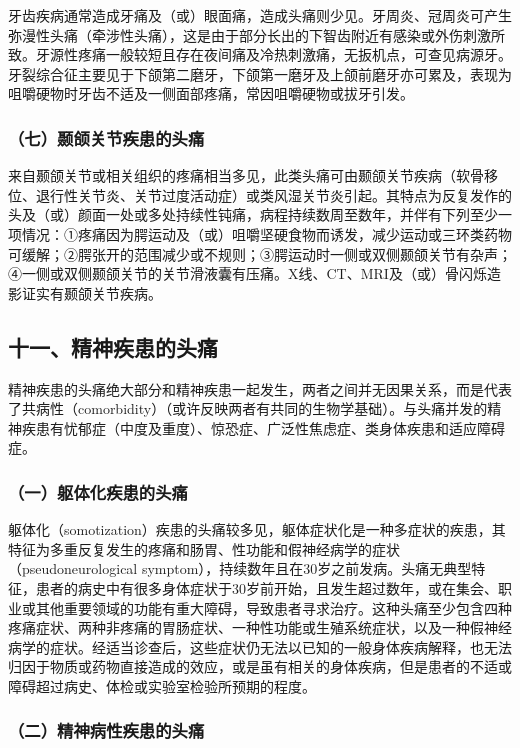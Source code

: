 牙齿疾病通常造成牙痛及（或）眼面痛，造成头痛则少见。牙周炎、冠周炎可产生弥漫性头痛（牵涉性头痛），这是由于部分长出的下智齿附近有感染或外伤刺激所致。牙源性疼痛一般较短且存在夜间痛及冷热刺激痛，无扳机点，可查见病源牙。牙裂综合征主要见于下颌第二磨牙，下颌第一磨牙及上颌前磨牙亦可累及，表现为咀嚼硬物时牙齿不适及一侧面部疼痛，常因咀嚼硬物或拔牙引发。

\subsubsection{（七）颞颌关节疾患的头痛}

来自颞颌关节或相关组织的疼痛相当多见，此类头痛可由颞颌关节疾病（软骨移位、退行性关节炎、关节过度活动症）或类风湿关节炎引起。其特点为反复发作的头及（或）颜面一处或多处持续性钝痛，病程持续数周至数年，并伴有下列至少一项情况：①疼痛因为腭运动及（或）咀嚼坚硬食物而诱发，减少运动或三环类药物可缓解；②腭张开的范围减少或不规则；③腭运动时一侧或双侧颞颌关节有杂声；④一侧或双侧颞颌关节的关节滑液囊有压痛。X线、CT、MRI及（或）骨闪烁造影证实有颞颌关节疾病。

\subsection{十一、精神疾患的头痛}

精神疾患的头痛绝大部分和精神疾患一起发生，两者之间并无因果关系，而是代表了共病性（comorbidity）（或许反映两者有共同的生物学基础）。与头痛并发的精神疾患有忧郁症（中度及重度）、惊恐症、广泛性焦虑症、类身体疾患和适应障碍症。

\subsubsection{（一）躯体化疾患的头痛}

躯体化（somotization）疾患的头痛较多见，躯体症状化是一种多症状的疾患，其特征为多重反复发生的疼痛和肠胃、性功能和假神经病学的症状（pseudoneurological
symptom），持续数年且在30岁之前发病。头痛无典型特征，患者的病史中有很多身体症状于30岁前开始，且发生超过数年，或在集会、职业或其他重要领域的功能有重大障碍，导致患者寻求治疗。这种头痛至少包含四种疼痛症状、两种非疼痛的胃肠症状、一种性功能或生殖系统症状，以及一种假神经病学的症状。经适当诊查后，这些症状仍无法以已知的一般身体疾病解释，也无法归因于物质或药物直接造成的效应，或是虽有相关的身体疾病，但是患者的不适或障碍超过病史、体检或实验室检验所预期的程度。

\subsubsection{（二）精神病性疾患的头痛}

